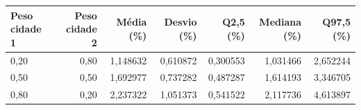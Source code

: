 \begin{tabular}{lrrrrrr}
\toprule
Peso cidade 1 & Peso cidade 2 & Média (\%) & Desvio (\%) & Q2,5 (\%) & Mediana (\%) & Q97,5 (\%) \\
\midrule
0,20 & 0,80 & 1,148632 & 0,610872 & 0,300553 & 1,031466 & 2,652244 \\
0,50 & 0,50 & 1,692977 & 0,737282 & 0,487287 & 1,614193 & 3,346705 \\
0,80 & 0,20 & 2,237322 & 1,051373 & 0,541522 & 2,117736 & 4,613897 \\
\bottomrule
\end{tabular}
